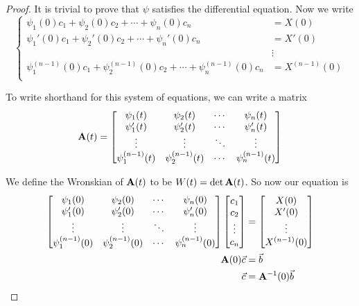\documentclass[12pt]{article}
\begin{document}
\begin{proof}
It is trivial to prove that $\psi$ satisfies the differential equation. Now we write
\[
\begin{cases}
\psi_1(0)c_1 + \psi_2(0)c_2 + \cdots + \psi_n(0)c_n &= X(0) \\
\psi_1'(0)c_1 + \psi_2'(0)c_2 + \cdots + \psi_n'(0)c_n &= X'(0) \\
&\vdots \\
\psi_1^{(n-1)}(0)c_1 + \psi_2^{(n-1)}(0)c_2 + \cdots + \psi_n^{(n-1)}(0)c_n &= X^{(n-1)}(0) \\
\end{cases}
\]

To write shorthand for this system of equations, we can write a matrix \[ {\bf A}(t) = 
\begin{bmatrix}
\psi_1(t) & \psi_2(t) & \cdots & \psi_n(t) \\
\psi_1'(t) & \psi_2'(t) & \cdots & \psi_n'(t) \\
\vdots & \vdots & \ddots & \vdots \\
\psi_1^{(n-1)}(t) & \psi_2^{(n-1)}(t) & \cdots & \psi_n^{(n-1)}(t)
\end{bmatrix}
\]

We define the Wronskian of ${\bf A}(t)$ to be $W(t) = \det{{\bf A}(t)}$. So now our equation is
\[
\begin{aligned}
  \begin{bmatrix}
    \psi_1(0) & \psi_2(0) & \cdots & \psi_n(0) \\
    \psi_1'(0) & \psi_2'(0) & \cdots & \psi_n'(0) \\
    \vdots & \vdots & \ddots & \vdots \\
    \psi_1^{(n-1)}(0) & \psi_2^{(n-1)}(0) & \cdots & \psi_n^{(n-1)}(0)
  \end{bmatrix}
  \begin{bmatrix}
    c_1 \\ c_2 \\ \vdots \\ c_n
  \end{bmatrix}
  &= 
  \begin{bmatrix}
    X(0) \\ X'(0) \\ \vdots \\ X^{(n-1)}(0)
  \end{bmatrix} \\
  {\bf A}(0)\vec{c} &= \vec{b}  \\
  \vec{c} &= {\bf A}^{-1}(0)\vec{b}
\end{aligned}
\]


\end{proof}
\end{document}
